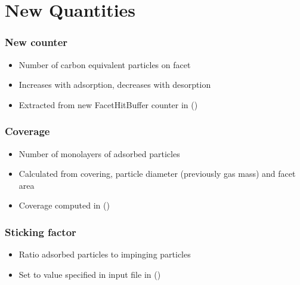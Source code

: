 \section{New Quantities}
\label{sub:quant}
\subsubsection{New counter }
\begin{itemize}[noitemsep,topsep=0pt, partopsep=0pt]
\item Number of carbon equivalent particles on facet
\item Increases with adsorption, decreases with desorption
\item Extracted from new FacetHitBuffer counter in  ()
\end{itemize}

\subsubsection{Coverage}
\begin{itemize}[noitemsep,topsep=0pt, partopsep=0pt]
\item Number of monolayers of adsorbed particles
\item Calculated from covering, particle diameter (previously gas mass) and facet area
\item Coverage computed in  ()
\end{itemize}

\subsubsection{Sticking factor}
\begin{itemize}[noitemsep,topsep=0pt, partopsep=0pt]
\item Ratio adsorbed particles to impinging particles
\item Set to value specified in input file in  ()
\end{itemize}

